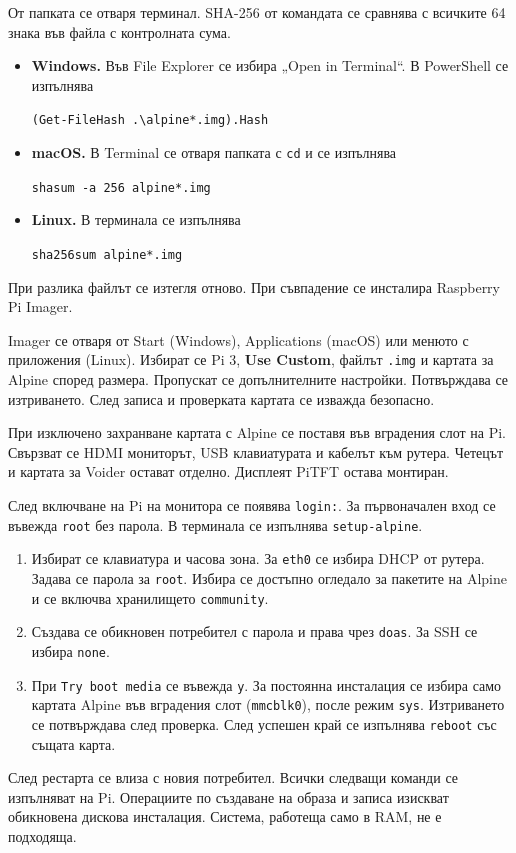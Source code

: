 От папката се отваря терминал. SHA-256 от командата се сравнява с всичките 64 знака във файла с контролната сума.
\begin{itemize}
\item \textbf{Windows.} Във File Explorer се избира „Open in Terminal“. В PowerShell се изпълнява
\par\verb|(Get-FileHash .\alpine*.img).Hash|
\item \textbf{macOS.} В Terminal се отваря папката с \texttt{cd} и се изпълнява\par\verb|shasum -a 256 alpine*.img|
\item \textbf{Linux.} В терминала се изпълнява\par\verb|sha256sum alpine*.img|
\end{itemize}
При разлика файлът се изтегля отново. При съвпадение се инсталира Raspberry Pi Imager.\par
\imagerSite\par
Imager се отваря от Start (Windows), Applications (macOS) или менюто с приложения (Linux). Избират се Pi 3, \textbf{Use Custom}, файлът \texttt{.img} и картата за Alpine според размера. Пропускат се допълнителните настройки. Потвърждава се изтриването. След записа и проверката картата се изважда безопасно.

При изключено захранване картата с Alpine се поставя във вградения слот на Pi. Свързват се HDMI мониторът, USB клавиатурата и кабелът към рутера. Четецът и картата за Voider остават отделно. Дисплеят PiTFT остава монтиран.

След включване на Pi на монитора се появява \texttt{login:}. За първоначален вход се въвежда \texttt{root} без парола. В терминала се изпълнява \texttt{setup-alpine}.
\begin{enumerate}
\item Избират се клавиатура и часова зона. За \texttt{eth0} се избира DHCP от рутера. Задава се парола за \texttt{root}. Избира се достъпно огледало за пакетите на Alpine и се включва хранилището \texttt{community}.
\item Създава се обикновен потребител с парола и права чрез \texttt{doas}. За SSH се избира \texttt{none}.
\item При \texttt{Try boot media} се въвежда \texttt{y}. За постоянна инсталация се избира само картата Alpine във вградения слот (\texttt{mmcblk0}), после режим \texttt{sys}. Изтриването се потвърждава след проверка. След успешен край се изпълнява \texttt{reboot} със същата карта.
\end{enumerate}
След рестарта се влиза с новия потребител. Всички следващи команди се изпълняват на Pi. Операциите по създаване на образа и записа изискват обикновена дискова инсталация. Система, работеща само в RAM, не е подходяща.

